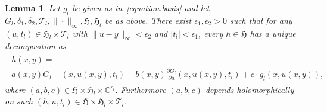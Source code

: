 \documentclass[11pt,twoside]{amsart}
\theoremstyle{plain}
\newtheorem{Lemma}[theorem]{Lemma}
\newcommand{\Tm}{\mathcal{T}}
\begin{document}
\begin{Lemma}\label{l5}
Let $g_l$ be given as in~\eqref {equation:basis} and let $G_l, \delta_1,\delta_2,\mathcal{T}_l,\|\cdot\|_\infty,\mathfrak{H},\mathfrak{H}_l$ be as above. There exist $\epsilon_1,\epsilon_2 > 0 $ such that for any $(u,t_l)\in\mathfrak{H}_l\times\Tm_l$ with $\|u-y\|_\infty<\epsilon_2 $ and $ |t_l| <\epsilon_1 $, every $h\in\mathfrak{H}$ has a unique decomposition as
\begin{gather}\label{f3}\begin{aligned}
h (x, y)=&\\a(x,y)G_l&(x,u(x,y),t_l)+b(x,y)\frac{\partial G_l}{\partial u}(x,u(x,y),t_l)+c\cdot g_l(x,u(x,y)),
\end{aligned}\end{gather}
where $ (a,b,c)\in\mathfrak {H}\times \mathfrak {H}_l\times \mathbb{C}^{r_l} $.
Furthermore $(a,b,c)$ depends holomorphically on such $(h,u,t_l)\in\mathfrak {H}\times\mathfrak {H}_l\times\Tm_l$.
\end{Lemma}
\end{document}
